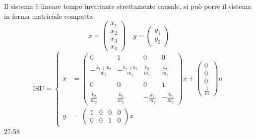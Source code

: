 \newpage
Il sistema è lineare tempo invariante strettamente causale, si può porre il
sistema in forma matriciale compatta
$$x =
\begin{pmatrix}
 x_1 \\ x_2 \\ x_3 \\ x_4
\end{pmatrix} \quad
y= \begin{pmatrix}
    y_1 \\ y_2
   \end{pmatrix}
$$
$$\text{ISU} = \left\{\begin{aligned}
\dot{x} &= \begin{pmatrix}
0 & 1 & 0 & 0 \\
\\
-\frac{k_1+k_2}{m_1} & -\frac{b_1+b_2}{m_1} &
\frac{k_2}{m_1} & \frac{b_2}{m_1}\\
\\
0 & 0 & 0 & 1\\ \\
\frac{k_2}{m_2} & \frac{b_2}{m_2} & -\frac{k_2}{m_2} & -\frac{b_2}{m_2}
          \end{pmatrix}x +
          \begin{pmatrix}
        0 \\ 0 \\ 0 \\ \frac{1}{m}
          \end{pmatrix}u\\
y &=      \begin{pmatrix}
           1 & 0 & 0 & 0 \\
           0 & 0 & 1 & 0
          \end{pmatrix}x
\end{aligned}\right.$$
27:58
